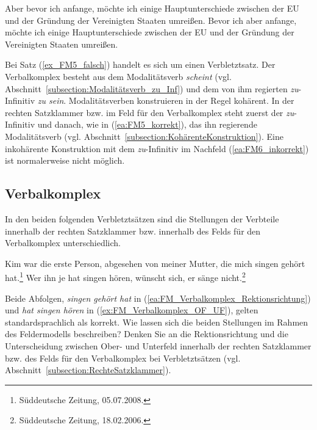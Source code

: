 \ea 
\ea \label{ea:FM3_korrekt} Aber bevor ich anfange, möchte ich einige Hauptunterschiede zwischen der EU und der Gründung der Vereinigten Staaten umreißen.
\ex \label{ex:FM4_korrekt} Bevor ich aber anfange, möchte ich einige Hauptunterschiede zwischen der EU und der Gründung der Vereinigten Staaten umreißen.
\z 
\z 

Bei Satz (\ref{ex_FM5_falsch}) handelt es sich um einen Verbletztsatz. Der Verbalkomplex besteht aus dem Modalitätsverb \textit{scheint} (vgl. Abschnitt~\ref{subsection:Modalitätsverb_zu_Inf}) und dem von ihm regierten \textit{zu}-Infinitiv \textit{zu sein}. Modalitätsverben konstruieren in der Regel kohärent. In der rechten Satzklammer bzw. im Feld für den Verbalkomplex steht zuerst der \textit{zu}-Infinitiv und danach, wie in (\ref{ea:FM5_korrekt}), das ihn regierende Modalitätsverb (vgl. Abschnitt~\ref{subsection:KohärenteKonstruktion}). Eine inkohärente Konstruktion mit dem \textit{zu}-Infinitiv im Nachfeld (\ref{ea:FM6_inkorrekt}) ist normalerweise nicht möglich.  

\ea 
{}\label{ea:FM5_korrekt}
\label{ea:FM6_inkorrekt}
\z 
\z 


\subsection{Verbalkomplex}\label{subsection:FM4}

In den beiden folgenden Verbletztsätzen sind die Stellungen der Verbteile innerhalb der rechten Satzklammer bzw. innerhalb des Felds für den Verbalkomplex unterschiedlich.

\ea \label{ea:FM_Verbalkomplex}
\ea \label{ea:FM_Verbalkomplex_Rektionsrichtung} Kim war die erste Person, abgesehen von meiner Mutter, die mich singen gehört hat.\footnote{Süddeutsche Zeitung, 05.07.2008.}
\ex \label{ex:FM_Verbalkomplex_OF_UF} Wer ihn je hat singen hören, wünscht sich, er sänge nicht.\footnote{Süddeutsche Zeitung, 18.02.2006.}
\z 
\z  

Beide Abfolgen, \textit{singen gehört hat} in (\ref{ea:FM_Verbalkomplex_Rektionsrichtung}) und \textit{hat singen hören} in (\ref{ex:FM_Verbalkomplex_OF_UF}), gelten standardsprachlich als korrekt. Wie lassen sich die beiden Stellungen im Rahmen des Feldermodells beschreiben? Denken Sie an die Rektionsrichtung und die Unterscheidung zwischen Ober- und Unterfeld innerhalb der rechten Satzklammer bzw. des Felds für den Verbalkomplex bei Verbletztsätzen (vgl. Abschnitt~\ref{subsection:RechteSatzklammer}).



